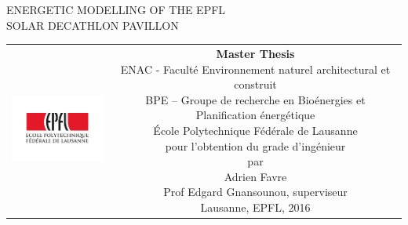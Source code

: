 \begin{titlepage}
\begin{center}
\sffamily


\null\vspace{2cm}
{\huge ENERGETIC MODELLING OF THE EPFL \\[12pt] SOLAR DECATHLON PAVILLON} \\[24pt] 
    
\vfill

\begin{tabular} {cc}
\parbox{0.3\textwidth}{\includegraphics[width=4cm]{images/epfl}}
&
\parbox{0.7\textwidth}{%
	\textbf{Master Thesis}\\
	ENAC - Faculté Environnement naturel architectural et construit\\
	BPE – Groupe de recherche en Bioénergies et Planification énergétique\\
%
	École Polytechnique Fédérale de Lausanne\\[6pt]
	pour l'obtention du grade d'ingénieur\\
	par\\ [4pt]
	\null \hspace{3em}  Adrien Favre\\[9pt]
%
\small
%
    Prof Edgard Gnansounou, superviseur\\[12pt]
%
Lausanne, EPFL, 2016}
\end{tabular}
\end{center}
\vspace{2cm}
\end{titlepage}



